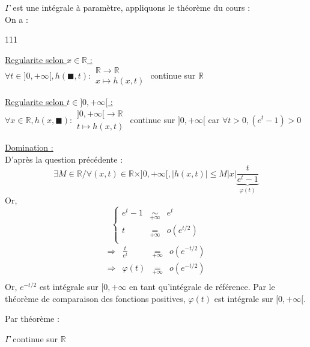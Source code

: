 $\Gamma$ est une intégrale à paramètre, appliquons le théorème du cours :\\
On a :
\begin{dinglist}{111}
  \item \ul{Regularite selon $x\in\mathbb{R}$ :}\\
  $
    \forall t\in ]0, +\infty[, h(\blacksquare, t) :
    \begin{array}{l}
      \mathbb{R}\rightarrow\mathbb{R} \\
      x\mapsto h(x, t)
    \end{array}
  $
  continue sur $\mathbb{R}$
  \item \ul{Regularite selon $t\in]0, +\infty[$ :}\\
    $
    \forall x\in \mathbb{R}, h(x, \blacksquare) :
    \begin{array}{l}
      ]0, +\infty[\rightarrow\mathbb{R} \\
      t\mapsto h(x, t)
    \end{array}
    $
      continue sur $ ]0, +\infty[$ car $\forall t>0, (e^t-1)>0$
    \item \ul{Domination :}\\
    D'après la question précédente :
    \[\exists M\in\mathbb{R} / \forall (x, t)\in \mathbb{R}\times]0, +\infty[, |h(x, t)| \leq M |x| \underbrace{\frac{t}{e^t-1}}_{\varphi(t)}\]
  Or,
  \[
    \left\{
    \begin{array}{rcl}
      e^t-1 & \underset{+\infty}{\sim} & e^t        \\
      t     & \underset{+\infty}{=}    & o(e^{t/2}) \\
    \end{array}
    \right.
  \]
  \[
    \begin{array}{rrcl}
      \Rightarrow & \frac{t}{e^t} & \underset{+\infty}{=} & o(e^{-t/2}) \\
      \Rightarrow & \varphi(t)    & \underset{+\infty}{=} & o(e^{-t/2}) \\
    \end{array}
  \]
  Or, $e^{-t/2}$ est intégrale sur $[0, +\infty$ en tant qu'intégrale de référence. Par le théorème de comparaison des fonctions positives, $\varphi(t)$ est intégrale sur $[0, +\infty[$.
\end{dinglist}
Par théorème :
\begin{result}
  $\Gamma$ continue sur $\mathbb{R}$
\end{result}
